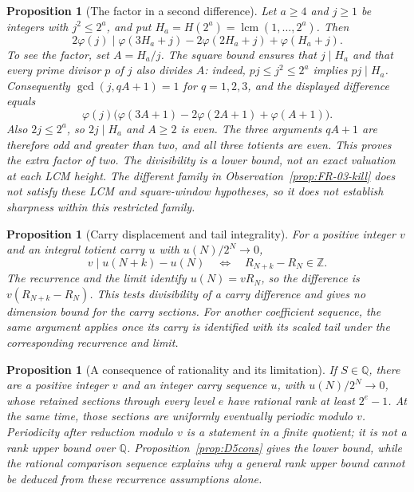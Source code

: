 \documentclass[11pt]{article}
\theoremstyle{plain}
\newtheorem{prop}[thm]{Proposition}
\theoremstyle{definition}
\theoremstyle{remark}
\newcommand{\Z}{\mathbb{Z}}
\begin{document}
\begin{prop}[The factor in a second difference]\label{prop:FR-02-inv}
Let $a\ge4$ and $j\ge1$ be integers with $j^2\le2^a$, and put
$H_a=H(2^a)=\operatorname{lcm}(1,\ldots,2^a)$. Then
\[
 2\varphi(j)\mid
 \varphi(3H_a+j)-2\varphi(2H_a+j)+\varphi(H_a+j).
\]
To see the factor, set $A=H_a/j$. The square bound ensures that $j\mid H_a$
and that every prime divisor $p$ of $j$ also divides $A$: indeed,
$pj\le j^2\le2^a$ implies $pj\mid H_a$. Consequently
$\gcd(j,qA+1)=1$ for $q=1,2,3$, and the displayed difference equals
\[
 \varphi(j)\bigl(\varphi(3A+1)-2\varphi(2A+1)+\varphi(A+1)\bigr).
\]
Also $2j\le2^a$, so $2j\mid H_a$ and $A\ge2$ is even. The three
arguments $qA+1$ are therefore odd and greater than two, and all three
totients are even. This proves the extra factor of two.
The divisibility is a lower bound, not an exact valuation at each LCM
height. The different family in Observation~\ref{prop:FR-03-kill} does
not satisfy these LCM and square-window hypotheses, so it does not
establish sharpness within this restricted family.
\end{prop}

\begin{prop}[Carry displacement and tail integrality]\label{prop:CP-01-inv}
For a positive integer $v$ and an integral totient carry $u$ with
$u(N)/2^N\to0$,
\[
 v\mid u(N+k)-u(N)\quad\Longleftrightarrow\quad R_{N+k}-R_N\in\Z.
\]
The recurrence and the limit identify $u(N)=vR_N$, so the
difference is $v(R_{N+k}-R_N)$. This tests divisibility of a carry
difference and gives no dimension bound for the carry sections.
For another coefficient sequence, the same argument applies once
its carry is identified with its scaled tail under the corresponding
recurrence and limit.
\end{prop}

\begin{prop}[A consequence of rationality and its limitation]\label{prop:CP-02}
If $S\in\mathbb Q$, there are a positive integer $v$ and an
integer carry sequence $u$, with $u(N)/2^N\to0$, whose retained
sections through every
level $e$ have rational rank at least $2^e-1$. At the same time, those
sections are uniformly eventually periodic modulo $v$.
Periodicity after reduction modulo $v$ is a statement in a finite
quotient; it is not a rank upper bound over $\mathbb Q$.
Proposition~\ref{prop:D5cons} gives the lower bound, while the rational
comparison sequence explains why a general rank upper bound cannot
be deduced from these recurrence assumptions alone.
\end{prop}
\end{document}
